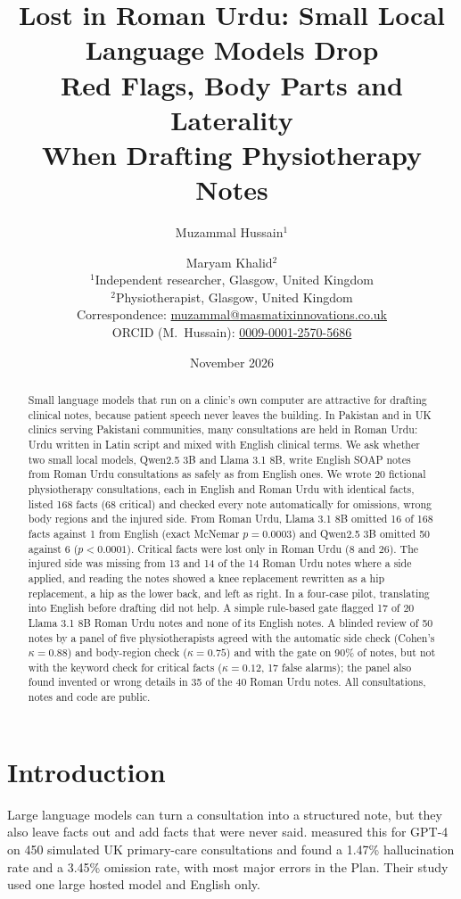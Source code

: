 \documentclass[11pt]{article}
\title{\textbf{Lost in Roman Urdu: Small Local Language Models Drop\\Red Flags, Body Parts and Laterality\\When Drafting Physiotherapy Notes}}
\author{Muzammal Hussain$^{1}$ \and Maryam Khalid$^{2}$\\[4pt]
\small $^{1}$Independent researcher, Glasgow, United Kingdom\\
\small $^{2}$Physiotherapist, Glasgow, United Kingdom\\
\small Correspondence: \href{mailto:muzammal@masmatixinnovations.co.uk}{muzammal@masmatixinnovations.co.uk}\\
\small ORCID (M.\ Hussain): \href{https://orcid.org/0009-0001-2570-5686}{0009-0001-2570-5686}}
\date{November 2026}
\begin{document}
\maketitle

\begin{abstract}
Small language models that run on a clinic's own computer are attractive for drafting clinical notes, because patient speech never leaves the building. In Pakistan and in UK clinics serving Pakistani communities, many consultations are held in Roman Urdu: Urdu written in Latin script and mixed with English clinical terms. We ask whether two small local models, Qwen2.5 3B and Llama 3.1 8B, write English SOAP notes from Roman Urdu consultations as safely as from English ones. We wrote 20 fictional physiotherapy consultations, each in English and Roman Urdu with identical facts, listed 168 facts (68 critical) and checked every note automatically for omissions, wrong body regions and the injured side. From Roman Urdu, Llama 3.1 8B omitted 16 of 168 facts against 1 from English (exact McNemar $p=0.0003$) and Qwen2.5 3B omitted 50 against 6 ($p<0.0001$). Critical facts were lost only in Roman Urdu (8 and 26). The injured side was missing from 13 and 14 of the 14 Roman Urdu notes where a side applied, and reading the notes showed a knee replacement rewritten as a hip replacement, a hip as the lower back, and left as right. In a four-case pilot, translating into English before drafting did not help. A simple rule-based gate flagged 17 of 20 Llama 3.1 8B Roman Urdu notes and none of its English notes. A blinded review of 50 notes by a panel of five physiotherapists agreed with the automatic side check (Cohen's $\kappa=0.88$) and body-region check ($\kappa=0.75$) and with the gate on 90\% of notes, but not with the keyword check for critical facts ($\kappa=0.12$, 17 false alarms); the panel also found invented or wrong details in 35 of the 40 Roman Urdu notes. All consultations, notes and code are public.
\end{abstract}

\section{Introduction}
Large language models can turn a consultation into a structured note, but they also leave facts out and add facts that were never said. \citet{asgari2025framework} measured this for GPT-4 on 450 simulated UK primary-care consultations and found a 1.47\% hallucination rate and a 3.45\% omission rate, with most major errors in the Plan. Their study used one large hosted model and English only.
\end{document}

